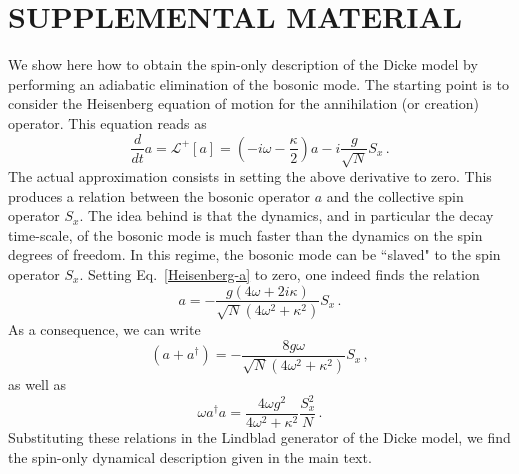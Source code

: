 \documentclass[prl,floatfix,twocolumn,superscriptaddress,showpacs,preprintnumbers,longbibliography,nofootinbib]{revtex4-1}
\begin{document}
\newpage
\onecolumngrid

\section{SUPPLEMENTAL MATERIAL}
\label{App:adiabatic-elimination}
We show here how to obtain the spin-only description of the Dicke model by performing an adiabatic elimination of the bosonic mode. The starting point is to consider the Heisenberg equation of motion for the annihilation (or creation) operator. This equation reads as 
\begin{equation}
\frac{d}{dt}a=\mathcal{L}^+[a]=\left(-i\omega -\frac{\kappa}{2}\right)a-i\frac{g}{\sqrt{N}}S_x\, .
\label{Heisenberg-a}
\end{equation}
The actual approximation consists in setting the above derivative to zero. This produces a relation between the bosonic operator $a$ and the collective spin operator $S_x$. The idea behind is that the dynamics, and in particular the decay time-scale, of the bosonic mode is much faster than the dynamics on the spin degrees of freedom. In this regime, the bosonic mode can be ``slaved" to the spin operator $S_x$. Setting Eq.~\eqref{Heisenberg-a} to zero, one indeed finds the relation
\begin{equation}
a=-\frac{g\left(4\omega +2i\kappa \right)}{\sqrt{N}\left(4\omega^2 +\kappa^2\right)}S_x\, .
\label{adiabatic-elimination}
\end{equation}
As a consequence, we can write 
$$
(a+a^\dagger)=-\frac{8g\omega}{\sqrt{N}\left(4\omega^2+\kappa^2\right)}S_x\, ,
$$
as well as 
$$
\omega a^\dagger a=\frac{4\omega g^2}{4\omega^2+\kappa^2}\frac{S_x^2}{N}\, .
$$
Substituting these relations in the Lindblad generator of the Dicke model, we find the spin-only dynamical description given in the main text. 
\end{document}
